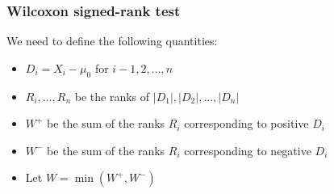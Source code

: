 \documentclass[a4paper]{article}\usepackage[]{graphicx}\usepackage[]{xcolor}
\begin{document}
\subsubsection{Wilcoxon signed-rank test}
We need to define the following quantities:
\begin{itemize}
	\item \( D_i = X_i - \mu_0 \) for \( i - 1,2,\dotsc,n \)
	\item \( R_i,\dotsc,R_n \) be the ranks of \( \lvert D_1 \rvert, \lvert D_2 \rvert, \dotsc, \lvert D_n \rvert \)
	\item \( W^+ \) be the sum of the ranks \( R_{i} \) corresponding to positive \( D_i \) 
	\item \( W^- \) be the sum of the ranks \( R_{i} \) corresponding to negative \( D_i \) 
	\item Let \( W = \min (W^+,W^-) \) 
\end{itemize}
\end{document}
